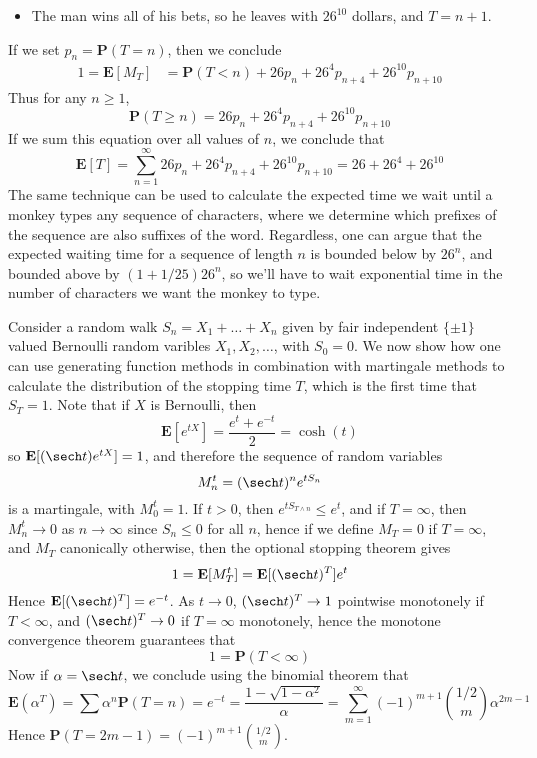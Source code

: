 \begin{example}
\begin{itemize}
        \item The man wins all of his bets, so he leaves with $26^{10}$ dollars, and $T = n + 1$.
    \end{itemize}
    If we set $p_n = \mathbf{P}(T = n)$, then we conclude
    \begin{align*}
        1 = \mathbf{E}[M_T] &= \mathbf{P}(T < n) + 26p_n + 26^4p_{n+4} + 26^{10}p_{n+10}
    \end{align*}
    Thus for any $n \geq 1$,
    \[ \mathbf{P}(T \geq n) = 26p_n + 26^4 p_{n+4} + 26^{10} p_{n + 10} \]
    If we sum this equation over all values of $n$, we conclude that
    \[ \mathbf{E}[T] = \sum_{n = 1}^\infty 26p_n + 26^4 p_{n+4} + 26^{10} p_{n+10} = 26 + 26^4 + 26^{10} \]
    The same technique can be used to calculate the expected time we wait until a monkey types any sequence of characters, where we determine which prefixes of the sequence are also suffixes of the word. Regardless, one can argue that the expected waiting time for a sequence of length $n$ is bounded below by $26^n$, and bounded above by $(1 + 1/25)26^n$, so we'll have to wait exponential time in the number of characters we want the monkey to type.
\end{example}

\begin{example}
    Consider a random walk $S_n = X_1 + \dots + X_n$ given by fair independent $\{ \pm 1 \}$ valued Bernoulli random varibles $X_1, X_2, \dots$, with $S_0 = 0$. We now show how one can use generating function methods in combination with martingale methods to calculate the distribution of the stopping time $T$, which is the first time that $S_T = 1$. Note that if $X$ is Bernoulli, then
    \[ \mathbf{E}[e^{tX}] = \frac{e^t + e^{-t}}{2} = \cosh(t) \]
    so $\mathbf{E}[(\sech t) e^{tX}] = 1$, and therefore the sequence of random variables
    \[ M_n^t = (\sech t)^n e^{tS_n} \]
    is a martingale, with $M_0^t = 1$. If $t > 0$, then $e^{tS_{T \wedge n}} \leq e^t$, and if $T = \infty$, then $M_n^t \to 0$ as $n \to \infty$ since $S_n \leq 0$ for all $n$, hence if we define $M_T = 0$ if $T = \infty$, and $M_T$ canonically otherwise, then the optional stopping theorem gives
    \[ 1 = \mathbf{E}[M_T^t] = \mathbf{E}[(\sech t)^T] e^t \]
    Hence $\mathbf{E}[(\sech t)^T] = e^{-t}$. As $t \to 0$, $(\sech t)^T \to 1$ pointwise monotonely if $T < \infty$, and $(\sech t)^T \to 0$ if $T = \infty$ monotonely, hence the monotone convergence theorem guarantees that
    \[ 1 = \mathbf{P}(T < \infty) \]
    Now if $\alpha = \sech t$, we conclude using the binomial theorem that
    \[ \mathbf{E}(\alpha^T) = \sum \alpha^n \mathbf{P}(T = n) = e^{-t} = \frac{1 - \sqrt{1 - \alpha^2}}{\alpha} = \sum_{m = 1}^\infty (-1)^{m+1} {1/2 \choose m} \alpha^{2m-1} \]
    Hence $\mathbf{P}(T = 2m - 1) = (-1)^{m+1} {1/2 \choose m}$.
\end{example}

